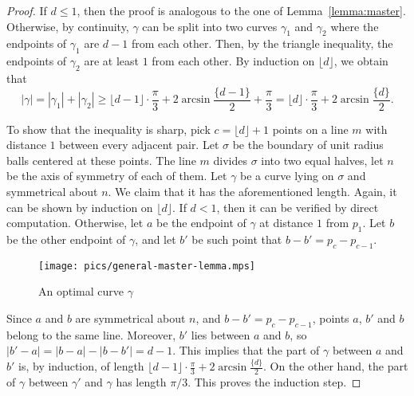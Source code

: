 \begin{proof}
If $d\leq 1$, then the proof is analogous to the one of Lemma~\ref{lemma:master}. Otherwise, by continuity, $\gamma$ can be split into two curves $\gamma_1$ and $\gamma_2$ where the endpoints of $\gamma_1$ are $d - 1$ from each other. Then, by the triangle inequality, the endpoints of $\gamma_2$ are at least $1$ from each other. By induction on $\lfloor d\rfloor$, we obtain that
$$|\gamma| = |\gamma_1| + |\gamma_2|\geq \lfloor d - 1\rfloor\cdot\frac{\pi}{3} + 2\arcsin\frac{\{d - 1\}}{2} + \frac{\pi}{3} = \lfloor d\rfloor\cdot\frac{\pi}{3} + 2\arcsin\frac{\{d\}}{2}.$$

To show that the inequality is sharp, pick $c = \lfloor d\rfloor + 1$ points on a line $m$ with distance $1$ between every adjacent pair. Let $\sigma$ be the boundary of unit radius balls centered at these points. The line $m$ divides $\sigma$ into two equal halves, let $n$ be the axis of symmetry of each of them. Let $\gamma$ be a curve lying on $\sigma$ and symmetrical about $n$. We claim that it has the aforementioned length. Again, it can be shown by induction on $\lfloor d\rfloor$. If $d < 1$, then it can be verified by direct computation. Otherwise, let $a$ be the endpoint of $\gamma$ at distance $1$ from $p_1$. Let $b$ be the other endpoint of $\gamma$, and let $b'$ be such point that $b - b' = p_c - p_{c - 1}$.

\begin{figure}
    \centering
    \texttt{[image: pics/general-master-lemma.mps]}
    \caption{An optimal curve $\gamma$}
    \label{fig:my_label}
\end{figure}

Since $a$ and $b$ are symmetrical about $n$, and $b - b' = p_c - p_{c-1}$, points $a$, $b'$ and $b$ belong to the same line. Moreover, $b'$ lies between $a$ and $b$, so $|b' - a| = |b - a| - |b - b'| = d - 1$. This implies that the part of $\gamma$ between $a$ and $b'$ is, by induction, of length $\lfloor d - 1\rfloor\cdot\frac{\pi}{3} + 2\arcsin\frac{\{d\}}{2}$. On the other hand, the part of $\gamma$ between $\gamma'$ and $\gamma$ has length $\pi/3$. This proves the induction step.
\end{proof}







